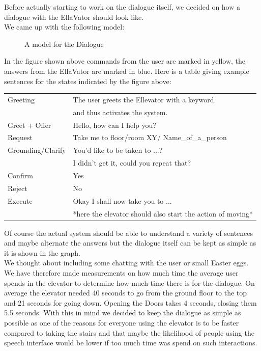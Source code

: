 Before actually starting to work on the dialogue itself, we decided on how a dialogue with the EllaVator should look like. \\

We came up with the following model: \\


\begin{figure} [ht]
\caption{A model for the Dialogue}
\label{fig: Dialogue flow}
\end{figure}

In the figure shown above commands from the user are marked in yellow, the answers from the EllaVator are marked in blue.
Here is a table giving example sentences for the states indicated by the figure above: \\


\begin{tabular}{|ll|}
\hline
Greeting & The user greets the Ellevator with a keyword \\
  & and thus activates the system.  \\
Greet + Offer & Hello, how can I help you? \\
Request & Take me to floor/room XY/ Name\_of\_a\_person \\
Grounding/Clarify & You'd like to be taken to ...?\\ 
 & I didn't get it, could you repeat that? \\
Confirm & Yes \\
Reject & No \\
Execute & Okay I shall now take you to ... \\ 
 & *here the elevator should also start the action of moving* \\
\hline 
\end{tabular}
\newline
Of course the actual system should be able to understand a variety of sentences and maybe alternate the answers but the dialogue itself can be kept as simple as it is shown in the graph.  \\

We thought about including some chatting with the user or small Easter eggs. 
We have therefore made measurements on how much time the average user spends in the elevator to determine how much time there is for the dialogue.
On average the elevator needed 40 seconds to go from the ground floor to the top and 21 seconds for going down. Opening the Doors takes 4 seconds, closing them 5.5 seconds.
With this in mind we decided to keep the dialogue as simple as possible as one of the reasons for everyone using the elevator is to be faster compared to taking the stairs and that maybe the likelihood of people using the speech interface would be lower if too much time was spend on such interactions.\\


